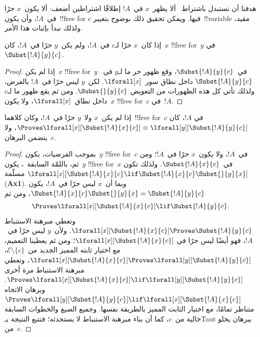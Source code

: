 \documentclass[../../../include/open-logic-section]{subfiles}
\begin{document}
\begin{explain}
هدفنا أن نستبدل باشتراط~ ألا يظهر~$x$ في~$!A$
إطلاقًا اشتراطين أضعف: ألا يكون~$x$ حرًا في~$!A$، وأن يكون~!!{free for}
$c$ فيها. ويمكن تحقيق ذلك بوضوح بتغيير~!!{variable} مقيد، ولذلك نبدأ
بإثبات هذا الأمر.
\end{explain}

\begin{lem}
إذا كان~$x$ حرًا لـ$c$ في~$!A$، ولم يكن~$y$ حرًا في~$!A$، كان~$x$
!!{free for}~$y$ في~$\Subst{!A}{y}{c}$.
\end{lem}

\begin{proof}
إذا لم يكن~$x$ !!{free for}~$y$ في~$\Subst{!A}{y}{c}$، وقع ظهور حر
ما لـ$y$ في~$\Subst{!A}{y}{c}$ داخل نطاق سور~$\lforall[x]$. لكن~$y$
ليس حرًا في~$!A$ بالفرض، ولذلك تأتي كل هذه الظهورات من التعويض
$\Subst{}{y}{c}$. ومن ثم يقع ظهور ما لـ$c$ داخل نطاق~$\lforall[x]$،
ولا يكون~$x$ !!{free for}~$c$ في~$!A$.
\end{proof}

\begin{lem}
إذا لم يكن~$x$ ولا~$y$ حرًا في~$!A$، وكان كلاهما~!!{free for}~$c$ في
$!A$، كان
$\Proves \lforall[x][\Subst{!A}{x}{c}] \equiv
\lforall[y][\Subst{!A}{y}{c}]$، ولا يتضمن البرهان~$c$.
\end{lem}

\begin{proof}
بموجب الفرضيات، يكون~$y$ !!{free for}~$c$ في~$!A$، ولا يكون~$x$ حرًا
في~$!A$؛ ومن ثم، باللمّة السابقة~، يكون~$y$
!!{free for}~$x$ في~$\Subst{!A}{x}{c}$. ولذلك تكون
$\lforall[x][\Subst{!A}{x}{c} \lif
\Subst{!A}{x}{c} \Subst{}{y}{x}]$ مسلّمة (\textbf{Ax1}). وبما أن~$x$
ليس حرًا في~$!A$، يكون
$\Subst{!A}{x}{c} \Subst{}{y}{x} = \Subst{!A}{y}{c}$، ومن ثم
\[
\Proves \lforall[x][\Subst{!A}{x}{c}] \lif \Subst{!A}{y}{c}.
\]
وتعطي مبرهنة الاستنباط
$\lforall[x][\Subst{!A}{x}{c}] \Proves \Subst{!A}{y}{c}$. ولأن~$y$
ليس حرًا في~$!A$، فهو أيضًا ليس حرًا في
$\lforall[x][\Subst{!A}{x}{c}]$؛ ومن ثم يعطينا التعميم، مع اختيار
ثابته المميز الجديد من~$\mathcal E\setminus\{c\}$،
$\lforall[x][\Subst{!A}{x}{c}] \Proves
\lforall[y][\Subst{!A}{y}{c}]$، وتعطي مبرهنة الاستنباط مرة أخرى
$\Proves \lforall[x][\Subst{!A}{x}{c}] \lif
\lforall[y][\Subst{!A}{y}{c}]$. وبرهان الاتجاه
$\Proves \lforall[y][\Subst{!A}{y}{c}] \lif
\lforall[x][\Subst{!A}{x}{c}]$ متناظر تمامًا، مع اختيار الثابت المميز
بالطريقة نفسها. وجميع الصيغ والخطوات السابقة خالية من~$c$، كما أن بناء
مبرهنة الاستنباط لا يستحدثه؛ فتتبع النتيجة بـTaut ببرهان يخلو من~$c$.
\end{proof}
\end{document}
